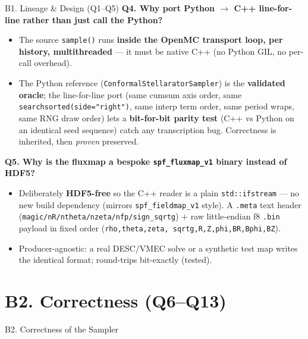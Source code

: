\documentclass[11pt,aspectratio=169]{beamer}
\newcommand{\qitem}[1]{\medskip\textbf{#1}\par}
\begin{document}
\begin{frame}[allowframebreaks]{B1. Lineage \& Design (Q1--Q5)}
\qitem{Q4. Why port Python $\to$ C++ line-for-line rather than just call the Python?}
\begin{itemize}
\item The source \texttt{sample()} runs \textbf{inside the OpenMC transport loop, per history,
      multithreaded} --- it must be native C++ (no Python GIL, no per-call overhead).
\item The Python reference (\texttt{ConformalStellaratorSampler}) is the \textbf{validated
      oracle}; the line-for-line port (same cumsum axis order, same
      \texttt{searchsorted(side="right")}, same interp term order, same period wraps, same RNG
      draw order) lets a \textbf{bit-for-bit parity test} (C++ vs Python on an identical seed
      sequence) catch any transcription bug. Correctness is inherited, then \emph{proven}
      preserved.
\end{itemize}

\qitem{Q5. Why is the fluxmap a bespoke \texttt{spf\_fluxmap\_v1} binary instead of HDF5?}
\begin{itemize}
\item Deliberately \textbf{HDF5-free} so the C++ reader is a plain \texttt{std::ifstream} ---
      no new build dependency (mirrors \texttt{spf\_fieldmap\_v1} style). A \texttt{.meta} text
      header (\texttt{magic/nR/ntheta/nzeta/nfp/sign\_sqrtg}) $+$ raw little-endian f8
      \texttt{.bin} payload in fixed order
      (\texttt{rho,theta,zeta, sqrtg,R,Z,phi,BR,Bphi,BZ}).
\item Producer-agnostic: a real DESC/VMEC solve or a synthetic test map writes the identical
      format; round-trips bit-exactly (tested).
\end{itemize}
\end{frame}

\section{B2. Correctness (Q6--Q13)}
\begin{frame}
\centering\vfill
{\Large\color{key} B2. Correctness of the Sampler}\par
{}
\vfill
\end{frame}
\end{document}
